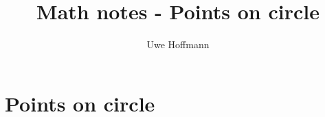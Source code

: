 

\title{Math notes - Points on circle}
\author{Uwe Hoffmann}



\setcounter{chapter}{0}
\chapter{Points on circle}
